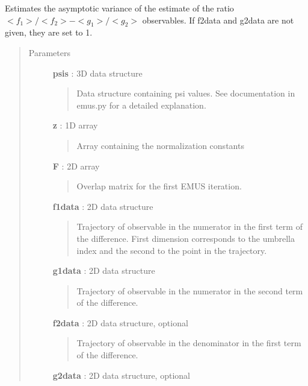 \documentclass[letterpaper,10pt,english]{sphinxmanual}
\begin{document}
\begin{fulllineitems}
\label{modules/avar:avar.avar_obs_diff}
Estimates the asymptotic variance of the estimate of the ratio \(<f_1>/<f_2>-<g_1>/<g_2>\) observables.  If f2data and g2data are not given, they are set to 1.
\begin{quote}\begin{description}
\item[{Parameters}] \leavevmode
\textbf{psis} : 3D data structure
\begin{quote}

Data structure containing psi values.  See documentation in emus.py for a detailed explanation.
\end{quote}

\textbf{z} : 1D array
\begin{quote}

Array containing the normalization constants
\end{quote}

\textbf{F} : 2D array
\begin{quote}

Overlap matrix for the first EMUS iteration.
\end{quote}

\textbf{f1data} : 2D data structure
\begin{quote}

Trajectory of observable in the numerator in the first term of the difference.  First dimension corresponds to the umbrella index and the second to the point in the trajectory.
\end{quote}

\textbf{g1data} : 2D data structure
\begin{quote}

Trajectory of observable in the numerator in the second term of the difference.
\end{quote}

\textbf{f2data} : 2D data structure, optional
\begin{quote}

Trajectory of observable in the denominator in the first term of the difference.
\end{quote}

\textbf{g2data} : 2D data structure, optional
\begin{quote}


\end{quote}
\end{description}
\end{quote}
\end{fulllineitems}
\end{document}
